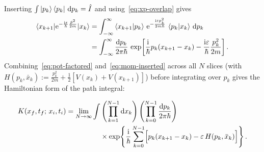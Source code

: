 \documentclass[11pt,a4paper]{article}
\newcommand{\ii}{\mathrm{i}}
\newcommand{\dd}{\mathrm{d}}
\newcommand{\ee}{\mathrm{e}}
\begin{document}
Inserting $\int\ket{p_k}\bra{p_k}\,\dd p_k = \hat I$ and using~\eqref{eq:xp-overlap} gives
\begin{equation}
\begin{aligned}
    \braket{x_{k+1}|\ee^{-\frac{\ii\varepsilon}{\hbar}\frac{\hat p^2}{2m}}|x_k}
    &= \int_{-\infty}^{\infty}\braket{x_{k+1}|p_k}\,\ee^{-\frac{\ii\varepsilon p_k^2}{2m\hbar}}\,\braket{p_k|x_k}\,\dd p_k \\
    &= \int_{-\infty}^{\infty}\frac{\dd p_k}{2\pi\hbar}\,
      \exp\!\left[\frac{\ii}{\hbar}p_k(x_{k+1}-x_k) - \frac{\ii\varepsilon}{\hbar}\frac{p_k^2}{2m}\right].
\end{aligned}
\label{eq:mom-inserted}
\end{equation}
Combining~\eqref{eq:pot-factored} and~\eqref{eq:mom-inserted} across all $N$ slices (with $H(p_k,\bar x_k) := \frac{p_k^2}{2m} + \frac{1}{2}[V(x_k)+V(x_{k+1})]$) before integrating over $p_k$ gives the Hamiltonian form of the path integral:

\begin{theorembox}
\begin{equation}
\begin{aligned}
    K(x_f,t_f;\,x_i,t_i)
    = \lim_{N\to\infty}\int &\left(\prod_{k=1}^{N-1}\dd x_k\right)\left(\prod_{k=0}^{N-1}\frac{\dd p_k}{2\pi\hbar}\right) \\
      &\times \exp\!\left\{\frac{\ii}{\hbar}\sum_{k=0}^{N-1}\Bigl[p_k(x_{k+1}-x_k) - \varepsilon\,H(p_k,\bar x_k)\Bigr]\right\}.
\end{aligned}
\label{eq:phase-space-pi}
\end{equation}
\end{theorembox}
\end{document}
